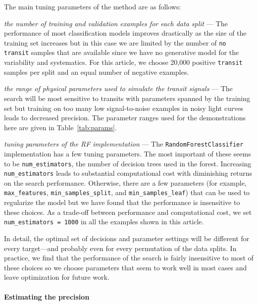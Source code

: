 \documentclass[12pt,preprint]{aastex}
\newcommand{\paper}{article}
\newcommand{\Tab}[1]{Table~\ref{tab:#1}}
\newcommand{\tab}[1]{\Tab{#1}}
\begin{document}
The main tuning parameters of the method are as follows:
\begin{itemize}

{\item \emph{the number of training and validation examples for each data
split} --- The performance of most classification models improves drastically
as the size of the training set increases but in this case we are limited by
the number of \texttt{no transit} samples that are available since we have no
generative model for the variability and systematics.
For this \paper, we choose 20,000 positive \texttt{transit} samples per split
and an equal number of negative examples.}

{\item \emph{the range of physical parameters used to simulate the transit
signals} --- The search will be most sensitive to transits with parameters
spanned by the training set but training on too many low signal-to-noise
examples in noisy light curves leads to decreased precision.
The parameter ranges used for the demonstrations here are given in
\tab{params}.}

{\item \emph{tuning parameters of the RF implementation} --- The
\texttt{RandomForestClassifier} implementation has a few tuning parameters.
The most important of these seems to be \texttt{num\_estimators}, the number
of decision trees used in the forest.
Increasing \texttt{num\_estimators} leads to substantial computational cost
with diminishing returns on the search performance.
Otherwise, there are a few parameters (for example, \texttt{max\_features},
\texttt{min\_samples\_split}, and \texttt{min\_samples\_leaf}) that can be
used to regularize the model but we have found that the performance is
insensitive to these choices.
As a trade-off between performance and computational cost, we set
\texttt{num\_estimators = 1000} in all the examples shown in this \paper.}

\end{itemize}
In detail, the optimal set of decisions and parameter settings will be
different for every target---and probably even for every permutation of the
data splits.
In practice, we find that the performance of the search is fairly insensitive
to most of these choices so we choose parameters that seem to work well in
most cases and leave optimization for future work.


\paragraph{Estimating the precision}
\end{document}
